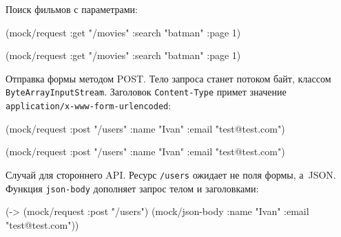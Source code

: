 \noindent
Поиск фильмов с параметрами:

\ifx\devicetype\mobile

\begin{english}
  \begin{clojure}
(mock/request :get "/movies"
  {:search "batman" :page 1})
  \end{clojure}
\end{english}

\else

\begin{english}
  \begin{clojure}
(mock/request :get "/movies" {:search "batman" :page 1})
  \end{clojure}
\end{english}

\fi


\noindent
Отправка формы методом POST. Тело запроса станет потоком байт, классом
\verb|ByteArrayInputStream|. Заголовок \verb|Content-Type| примет значение
\verb|application/x-www-form-urlencoded|:

\ifx\devicetype\mobile

\begin{english}
  \begin{clojure}
(mock/request :post "/users"
  {:name "Ivan" :email "test@test.com"})
  \end{clojure}
\end{english}

\else

\begin{english}
  \begin{clojure}
(mock/request :post "/users"
              {:name "Ivan" :email "test@test.com"})
  \end{clojure}
\end{english}

\fi


\noindent
Случай для стороннего API. Ресурс \verb|/users| ожидает не поля формы, а~JSON.
Функция \verb|json-body| дополняет запрос телом и заголовками:

\ifx\devicetype\mobile

\begin{english}
  \begin{clojure}
(-> (mock/request :post "/users")
    (mock/json-body
      {:name "Ivan"
       :email "test@test.com"}))
  \end{clojure}
\end{english}

